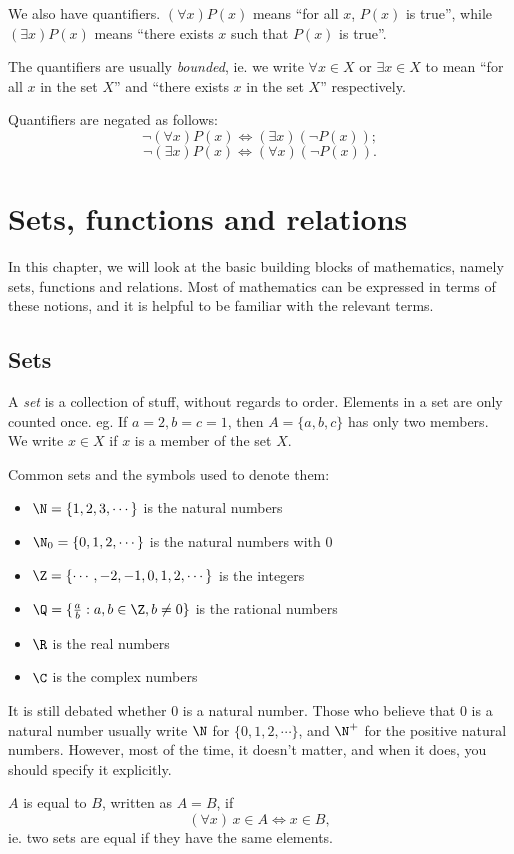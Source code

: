 \documentclass[a4paper]{article}
\begin{document}
We also have quantifiers. $(\forall x) P(x)$ means ``for all $x$, $P(x)$ is true'', while $(\exists x) P(x)$ means ``there exists $x$ such that $P(x)$ is true''.

The quantifiers are usually \emph{bounded}, ie. we write $\forall x\in X$ or $\exists x\in X$ to mean ``for all $x$ in the set $X$'' and ``there exists $x$ in the set $X$'' respectively.

Quantifiers are negated as follows:
\[
  \neg (\forall x) P(x) \Leftrightarrow (\exists x)(\neg P(x));
\]
\[
  \neg (\exists x) P(x) \Leftrightarrow (\forall x)(\neg P(x)).
\]
\section{Sets, functions and relations}
In this chapter, we will look at the basic building blocks of mathematics, namely sets, functions and relations. Most of mathematics can be expressed in terms of these notions, and it is helpful to be familiar with the relevant terms.
\subsection{Sets}
\begin{defi}[Set]
  A \emph{set} is a collection of stuff, without regards to order. Elements in a set are only counted once. eg. If $a = 2, b = c = 1$, then $A = \{a, b, c\}$ has only two members. We write $x\in X$ if $x$ is a member of the set $X$.
\end{defi}

\begin{eg}
  Common sets and the symbols used to denote them:
  \begin{itemize}
    \item $\N = \{1, 2, 3, \cdots \}$ is the natural numbers
    \item $\N_0 = \{0, 1, 2, \cdots \}$ is the natural numbers with $0$
    \item $\Z = \{\cdots, -2, -1, 0, 1, 2, \cdots \}$ is the integers
    \item $\Q = \{\frac{a}{b}: a, b\in \Z, b \not= 0\}$ is the rational numbers
    \item $\R$ is the real numbers
    \item $\C$ is the complex numbers
  \end{itemize}
  It is still debated whether $0$ is a natural number. Those who believe that $0$ is a natural number usually write $\N$ for $\{0, 1, 2, \cdots\}$, and $\N^+$ for the positive natural numbers. However, most of the time, it doesn't matter, and when it does, you should specify it explicitly.
\end{eg}
\begin{defi}
  $A$ is equal to $B$, written as $A = B$, if
  \[
    (\forall x)\,x\in A \Leftrightarrow x\in B,
  \]
  ie. two sets are equal if they have the same elements.
\end{defi}
\end{document}
